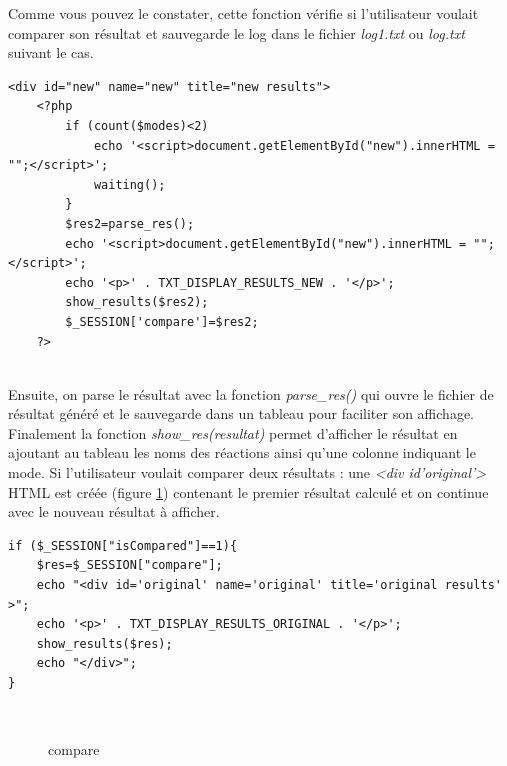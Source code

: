 Comme vous pouvez le constater, cette fonction vérifie si l'utilisateur voulait comparer son résultat et sauvegarde le log dans le fichier \emph{log1.txt} ou \emph{log.txt} suivant le cas.\\

\begin{DDbox}{\linewidth}
\begin{lstlisting}
<div id="new" name="new" title="new results">
	<?php
		if (count($modes)<2)
			echo '<script>document.getElementById("new").innerHTML = "";</script>';
			waiting();
		}
		$res2=parse_res();
		echo '<script>document.getElementById("new").innerHTML = "";</script>';
		echo '<p>' . TXT_DISPLAY_RESULTS_NEW . '</p>';
		show_results($res2);
		$_SESSION['compare']=$res2;
	?>		
\end{lstlisting}
\end{DDbox}\\

Ensuite, on parse le résultat avec la fonction \emph{parse\_res()} qui ouvre le fichier de résultat généré et le sauvegarde dans un tableau pour faciliter son affichage.
Finalement la fonction \emph{show\_res(resultat)} permet d'afficher le résultat en ajoutant au tableau les noms des réactions ainsi qu'une colonne indiquant le mode.
 Si l'utilisateur voulait comparer deux résultats : une \emph{<div id'original'>} HTML est créée (figure \ref{comparaison}) contenant le premier résultat calculé et on continue avec le nouveau résultat à afficher.\\

\begin{DDbox}{\linewidth}
\begin{lstlisting}
if ($_SESSION["isCompared"]==1){
	$res=$_SESSION["compare"];
	echo "<div id='original' name='original' title='original results' >";
	echo '<p>' . TXT_DISPLAY_RESULTS_ORIGINAL . '</p>';
	show_results($res);
	echo "</div>";
}
\end{lstlisting}
\end{DDbox}\\


\begin{figure}[!ht]
    \begin{center}
        \caption{compare}
          \label{comparaison}
      \end{center}   
\end{figure}

